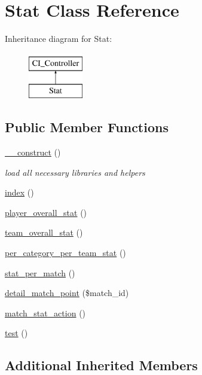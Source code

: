 \hypertarget{class_stat}{}\section{Stat Class Reference}
\label{class_stat}
Inheritance diagram for Stat\+:\begin{figure}[H]
\begin{center}
\leavevmode
\includegraphics[height=2.000000cm]{class_stat}
\end{center}
\end{figure}
\subsection*{Public Member Functions}
\begin{DoxyCompactItemize}
\item 
\hyperlink{class_stat_a095c5d389db211932136b53f25f39685}{\+\_\+\+\_\+construct} ()
\begin{DoxyCompactList}\small\item\em load all necessary libraries and helpers \end{DoxyCompactList}\item 
\hyperlink{class_stat_a149eb92716c1084a935e04a8d95f7347}{index} ()
\item 
\hyperlink{class_stat_a774a1f412e5cfd5404290b2b68f1b6cf}{player\+\_\+overall\+\_\+stat} ()
\item 
\hyperlink{class_stat_a452f14a2e46159e0ee877e5da5b03e1e}{team\+\_\+overall\+\_\+stat} ()
\item 
\hyperlink{class_stat_acfa5d4c6e5e3272b6e591bc6332eaaa1}{per\+\_\+category\+\_\+per\+\_\+team\+\_\+stat} ()
\item 
\hyperlink{class_stat_acad910746a6b7531ad8efb1fc4bc035b}{stat\+\_\+per\+\_\+match} ()
\item 
\hyperlink{class_stat_ac8037ef9324eb746217b27d4de1a5e06}{detail\+\_\+match\+\_\+point} (\$match\+\_\+id)
\item 
\hyperlink{class_stat_a3e344a47150e38b0a37a97502f9e9a29}{match\+\_\+stat\+\_\+action} ()
\item 
\hyperlink{class_stat_ad69dd4607977cae05ebe19d1ae604fb1}{test} ()
\end{DoxyCompactItemize}
\subsection*{Additional Inherited Members}


